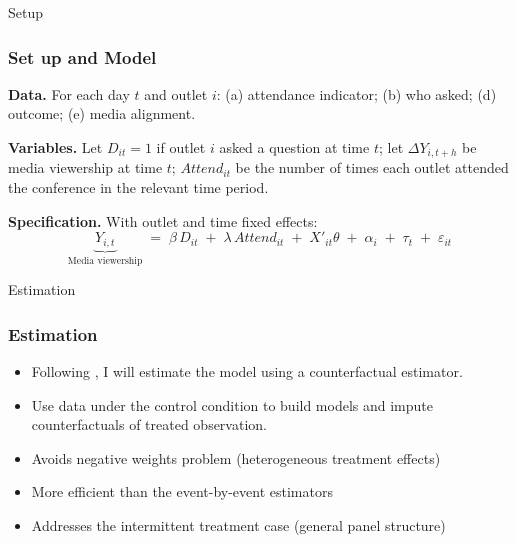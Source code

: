 \documentclass[10pt,aspectratio=169]{beamer}
\begin{document}

\begin{frame}{Setup}\frametitle{Set up and Model}
\small
\textbf{Data.} For each day $t$ and outlet $i$: (a) attendance indicator; (b) who asked;  (d) outcome; (e) media alignment.

\medskip
\textbf{Variables.} Let $D_{it}=1$ if outlet $i$ asked a question at time $t$; let $\Delta Y_{i,t+h}$ be media viewership at time $t$; $Attend_{it}$ be the number of times each outlet attended the conference in the relevant time period.

\medskip
\textbf{Specification.} With outlet and time fixed effects:
\[
\underbrace{ Y_{i,t}}_{\text{Media viewership}}
\;=\;
\beta\,D_{it}
\;+\;
\lambda\,\textit{Attend}_{it}
\;+\;
X'_{it}\theta
\;+\;
\alpha_i
\;+\;
\tau_t
\;+\;
\varepsilon_{it}
\]

\medskip

\end{frame}


\begin{frame}{Estimation}\frametitle{Estimation}
\small


\begin{itemize}\setlength\itemsep{0.65em}
    \item Following \citet{LiuEtAl}, I will estimate the model using a counterfactual estimator.
    \item Use data under the control condition to build models and impute counterfactuals of treated observation.
    \item Avoids negative weights problem (heterogeneous treatment effects)
    \item More efficient than the event-by-event estimators \citep{Borusyak-DIDImp}
    \item Addresses the intermittent treatment case (general panel structure)
\end{itemize}



\medskip

\end{frame}
\end{document}
